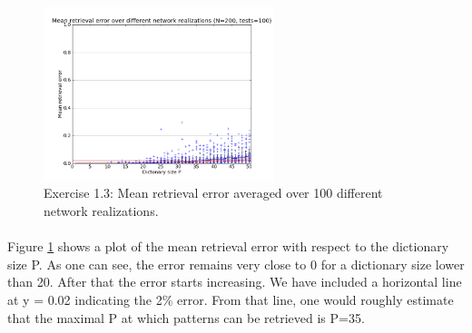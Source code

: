 \begin{figure}
  \vspace{-20pt}
  \begin{center}
    \includegraphics[width=0.6\textwidth]{img/plots/error-avg-100.png}
  \end{center}
  \vspace{-20pt}
  \caption{Exercise 1.3: Mean retrieval error averaged over 100 different network realizations.}
  \label{fig: Question 1.3}
  \vspace{-10pt}
\end{figure}
\paragraph*{}

Figure \ref{fig: Question 1.3} shows a plot of the mean retrieval error with respect to the dictionary size P. As one can see, the error remains very close to 0 for a dictionary size lower than 20. After that the error starts increasing. We have included a horizontal line at y = 0.02 indicating the 2$\%$ error. From that line, one would roughly estimate that the maximal P at which patterns can be retrieved is P=35. 

